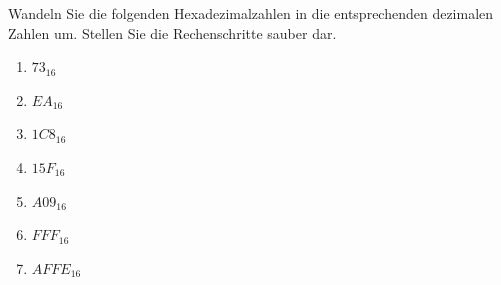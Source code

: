 Wandeln Sie die folgenden Hexadezimalzahlen in die entsprechenden dezimalen Zahlen um. Stellen Sie die Rechenschritte sauber dar.

\begin{enumerate}
\item $73_{16}$
\fillwithgrid{1.25in}
\item $EA_{16}$
\fillwithgrid{1.25in}
\item $1C8_{16}$
\fillwithgrid{1.25in}
\item $15F_{16}$
\fillwithgrid{1.25in}
\item $A09_{16}$
\fillwithgrid{1.25in}
\item $FFF_{16}$
\fillwithgrid{1.25in}
\item $AFFE_{16}$
\fillwithgrid{1.25in}
\end{enumerate}

